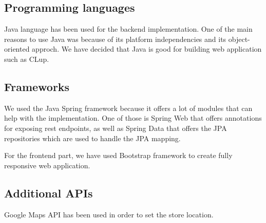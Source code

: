 \subsection{Programming languages}

Java language has been used for the backend implementation.
One of the main reasons to use Java was because of its platform independencies and its object-oriented approch.
We have decided that Java is good for building web application such as CLup.

\subsection{Frameworks}

We used the Java Spring framework because it offers a lot of modules that can help with the implementation.
One of those is Spring Web that offers annotations for exposing rest endpoints, as well as Spring Data
that offers the JPA repositories which are used to handle the JPA mapping.

For the frontend part, we have used Bootstrap framework to create fully responsive web application.

\subsection{Additional APIs}

Google Maps API has been used in order to set the store location.

